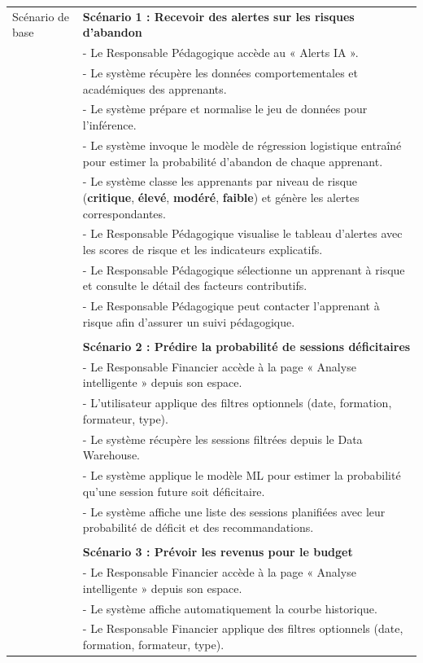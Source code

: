 {\begin{longtable}{|l|p{12cm}|}
Scénario de base &
\textbf{Scénario 1 : Recevoir des alertes sur les risques d'abandon} \\
&- Le Responsable Pédagogique accède au « Alerts IA ». \\
&- Le système récupère les données comportementales et académiques des apprenants. \\
&- Le système prépare et normalise le jeu de données pour l'inférence. \\
&- Le système invoque le modèle de régression logistique entraîné pour estimer la probabilité d'abandon de chaque apprenant. \\
&- Le système classe les apprenants par niveau de risque (\textbf{critique}, \textbf{élevé}, \textbf{modéré}, \textbf{faible}) et génère les alertes correspondantes. \\
&- Le Responsable Pédagogique visualise le tableau d'alertes avec les scores de risque et les indicateurs explicatifs. \\
&- Le Responsable Pédagogique sélectionne un apprenant à risque et consulte le détail des facteurs contributifs. \\
&- Le Responsable Pédagogique peut contacter l'apprenant à risque afin d'assurer un suivi pédagogique. \\
\\
& \textbf{Scénario 2 : Prédire la probabilité de sessions déficitaires} \\
&- Le Responsable Financier accède à la page « Analyse intelligente » depuis son espace. \\
&- L'utilisateur applique des filtres optionnels (date, formation, formateur, type). \\
&- Le système récupère les sessions filtrées depuis le Data Warehouse. \\
&- Le système applique le modèle ML pour estimer la probabilité qu'une session future soit déficitaire. \\
&- Le système affiche une liste des sessions planifiées avec leur probabilité de déficit et des recommandations. \\
\\
& \textbf{Scénario 3 : Prévoir les revenus pour le budget} \\
&- Le Responsable Financier accède à la page « Analyse intelligente » depuis son espace. \\
&- Le système affiche automatiquement la courbe historique. \\
&- Le Responsable Financier applique des filtres optionnels (date, formation, formateur, type). \\

\end{longtable}}
